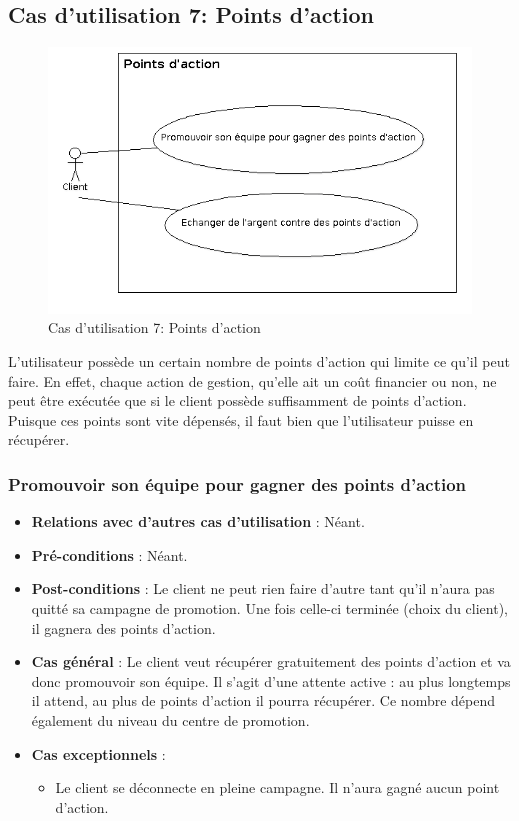 \documentclass[a4paper,titlepage]{scrreprt}
\begin{document}
  \subsection{Cas d'utilisation 7: Points d'action}
  \begin{figure}[H]
    \center
    \includegraphics[scale=0.5]{uml/useCaseView/PointsAction.png}
    \caption{Cas d'utilisation 7: Points d'action}
  \end{figure}  
    L'utilisateur possède un certain nombre de points d'action qui limite ce qu'il peut faire. En effet, chaque action de gestion, qu'elle ait un coût financier ou non, ne peut être exécutée que si le client possède suffisamment de points d'action. Puisque ces points sont vite dépensés, il faut bien que l'utilisateur puisse en récupérer.

    \subsubsection{Promouvoir son équipe pour gagner des points d'action}
      \begin{itemize}
        \item \textbf{Relations avec d'autres cas d'utilisation}  : Néant.
        \item \textbf{Pré-conditions} : Néant.
        \item \textbf{Post-conditions} : Le client ne peut rien faire d'autre tant qu'il n'aura pas quitté sa campagne de promotion. Une fois celle-ci terminée (choix du client), il gagnera des points d'action.
        \item \textbf{Cas général} : Le client veut récupérer gratuitement des points d'action et va donc promouvoir son équipe. Il s'agit d'une attente active : au plus longtemps il attend, au plus de points d'action il pourra récupérer. Ce nombre dépend également du niveau du centre de promotion.
        \item \textbf{Cas exceptionnels} :
          \begin{itemize}
            \item Le client se déconnecte en pleine campagne. Il n'aura gagné aucun point d'action.
          \end{itemize}
      \end{itemize}
\end{document}
